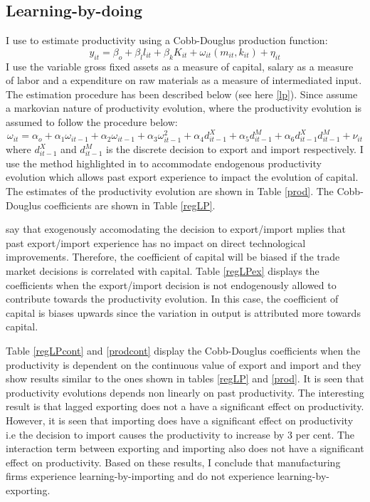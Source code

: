 \documentclass[11pt]{article}
\begin{document}
\subsection{Learning-by-doing}
I use \cite{levinsohn2003estimating} to estimate productivity using  a Cobb-Douglus production function: 
\begin{equation}
y_{it} = \beta_{o} + \beta_{l}l_{it} + \beta_{k}K_{it} +
\omega_{it}(m_{it}, k_{it}) + \eta_{it} 
\end{equation}
I use the variable gross fixed assets as a measure of capital, salary
as a measure of labor and a expenditure on raw materials as a measure
of intermediated input. The estimation procedure has been described
below (see here \ref{lp}). Since \cite{levinsohn2003estimating} assume
a markovian nature of productivity evolution, where the
productivity evolution is assumed to follow the procedure below:
$$ \omega_{it} = \alpha_{o} + \alpha_{1}\omega_{it-1} +
\alpha_{2}\omega_{it-1} + \alpha_{3}\omega_{it-1}^{2}+
\alpha_{4}d_{it-1}^{X} + \alpha_{5} d_{it-1}^{M} +
\alpha_{6}d_{it-1}^{X}d_{it-1}^{M}  + \nu_{it}
$$ 
where $d_{it-1}^{X}$ and $d_{it-1}^{M}$ is the discrete decision to
export and import respectively. 
 I use the method highlighted in \cite{de2013detecting}  to accommodate endogenous
productivity evolution which allows  past export experience to impact
the evolution of capital. The estimates of the productivity evolution
are shown in Table \ref{prod}. The Cobb-Douglus coefficients are shown in
Table \ref{regLP}. 

 

\cite{de2013detecting} say that exogenously accomodating the
decision to export/import mplies that
past export/import experience has no impact on direct technological
improvements. Therefore, the coefficient of capital will be biased if
the trade market decisions is correlated with capital. Table
\ref{regLPex} displays the coefficients when the export/import
decision is not endogenously allowed to contribute towards the
productivity evolution. In this case, the coefficient of capital is
biases upwards since the variation in output is attributed more
towards capital.   


Table \ref{regLPcont} and \ref{prodcont} display the Cobb-Douglus coefficients when the
productivity is dependent on the continuous value of export and import
and they show results similar to the ones shown in tables \ref{regLP} and \ref{prod}. 
It is seen that productivity evolutions depends non linearly on past
productivity. The interesting result is that lagged exporting does not a have
a significant effect on productivity. However, it is seen that
importing does have a significant effect on productivity i.e the
decision to import causes the productivity to increase by 3 per
cent. The interaction term between exporting and importing also does
not have a significant effect on productivity. Based on these results, I
conclude that manufacturing firms experience learning-by-importing and
do not experience learning-by-exporting.
\end{document}
